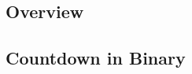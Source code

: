 
\subsection{Overview}

%
%	                    
%
%
%
%
%


\subsection{Countdown in Binary}


%
%
%
%
%
%
%


